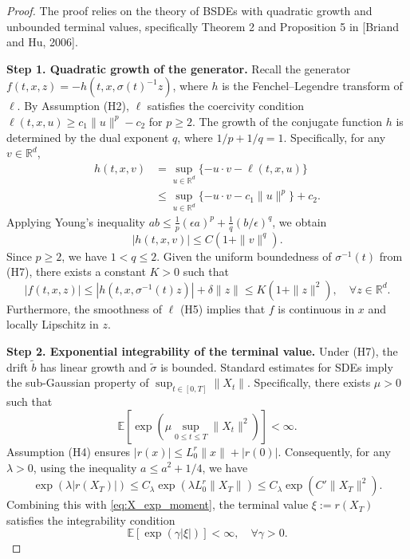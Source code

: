 \documentclass[11pt]{article}
\begin{document}
\begin{proof}
The proof relies on the theory of BSDEs with quadratic growth and unbounded terminal values, specifically Theorem 2 and Proposition 5 in [Briand and Hu, 2006].

\noindent\textbf{Step 1. Quadratic growth of the generator.}
Recall the generator $f(t,x,z) = -h(t,x, \sigma(t)^{-1}z)$, where $h$ is the Fenchel--Legendre transform of $\ell$.
By Assumption (H2), $\ell$ satisfies the coercivity condition $\ell(t,x,u) \ge c_1 \|u\|^p - c_2$ for $p \ge 2$.
The growth of the conjugate function $h$ is determined by the dual exponent $q$, where $1/p + 1/q = 1$.
Specifically, for any $v \in \mathbb{R}^d$,
\begin{align*}
    h(t,x,v) &= \sup_{u \in \mathbb{R}^d} \{-u \cdot v - \ell(t,x,u)\} \\
    &\le \sup_{u \in \mathbb{R}^d} \{-u \cdot v - c_1 \|u\|^p \} + c_2.
\end{align*}
Applying Young's inequality $a b \le \frac{1}{p}(\epsilon a)^p + \frac{1}{q}(b/\epsilon)^q$, we obtain
\begin{equation*}
    |h(t,x,v)| \le C(1 + \|v\|^q).
\end{equation*}
Since $p \ge 2$, we have $1 < q \le 2$. Given the uniform boundedness of $\sigma^{-1}(t)$ from (H7), there exists a constant $K > 0$ such that
\begin{equation}\label{eq:quad_growth}
    |f(t,x,z)| \le |h(t,x, \sigma^{-1}(t)z)| + \delta \|z\| \le K(1 + \|z\|^2), \quad \forall z \in \mathbb{R}^d.
\end{equation}
Furthermore, the smoothness of $\ell$ (H5) implies that $f$ is continuous in $x$ and locally Lipschitz in $z$.

\noindent\textbf{Step 2. Exponential integrability of the terminal value.}
Under (H7), the drift $\tilde{b}$ has linear growth and $\tilde{\sigma}$ is bounded. Standard estimates for SDEs imply the sub-Gaussian property of $\sup_{t \in [0,T]} \|X_t\|$.
Specifically, there exists $\mu > 0$ such that
\begin{equation}\label{eq:X_exp_moment}
    \mathbb{E}\left[ \exp\left( \mu \sup_{0\le t\le T} \|X_t\|^2 \right) \right] < \infty.
\end{equation}
Assumption (H4) ensures $|r(x)| \le L_0^r \|x\| + |r(0)|$.
Consequently, for any $\lambda > 0$, using the inequality $a \le a^2 + 1/4$, we have
\begin{equation*}
    \exp(\lambda |r(X_T)|) \le C_\lambda \exp( \lambda L_0^r \|X_T\|) \le C_\lambda \exp(C' \|X_T\|^2).
\end{equation*}
Combining this with \eqref{eq:X_exp_moment}, the terminal value $\xi := r(X_T)$ satisfies the integrability condition
\begin{equation}\label{eq:terminal_integrability}
    \mathbb{E}\left[ \exp(\gamma |\xi|) \right] < \infty, \quad \forall \gamma > 0.
\end{equation}


\end{proof}
\end{document}
